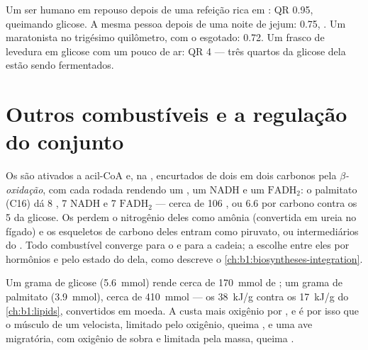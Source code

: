 \begin{example}[Ler um QR]\label{ex:b1:respiration-fermentation:readrq}
Um ser humano em repouso depois de uma refeição rica em : QR
0.95, queimando glicose. A mesma pessoa depois de uma noite de jejum:
0.75, . Um maratonista no trigésimo quilômetro, com o 
esgotado: 0.72. Um frasco de levedura em glicose com um pouco de ar: QR
4 --- três quartos da glicose dela estão sendo fermentados.
\end{example}

\section{Outros combustíveis e a regulação do conjunto}

\begin{proposition}\label{prop:b1:respiration-fermentation:otherfuels}
Os  são ativados a acil-CoA e, na ,
encurtados de dois em dois carbonos pela \emph{$\beta$-oxidação}, com
cada rodada rendendo um , um NADH e um $\mathrm{FADH_2}$: o
palmitato (C16) dá 8 , 7 NADH e 7 $\mathrm{FADH_2}$ --- cerca
de 106 , ou \qty{6.6}{}  por carbono contra os 5 da glicose. Os
 perdem o nitrogênio deles como amônia (convertida em ureia
no fígado) e os esqueletos de carbono deles entram como piruvato,
 ou intermediários do . Todo combustível
converge para o  e para a cadeia; a  escolhe entre eles
por hormônios e pelo estado do  dela, como descreve o
\cref{ch:b1:biosyntheses-integration}.
\end{proposition}

\begin{example}\label{ex:b1:respiration-fermentation:gramofeach}
Um grama de glicose (\qty{5.6}{mmol}) rende cerca de \qty{170}{mmol} de
; um grama de palmitato (\qty{3.9}{mmol}), cerca de \qty{410}{mmol}
--- os \qty{38}{kJ/g} contra os \qty{17}{kJ/g} do \cref{ch:b1:lipids},
convertidos em moeda. A  custa mais oxigênio por , e é por
isso que o músculo de um velocista, limitado pelo oxigênio, queima
, e uma ave migratória, com oxigênio de sobra e limitada pela
massa, queima .
\end{example}

